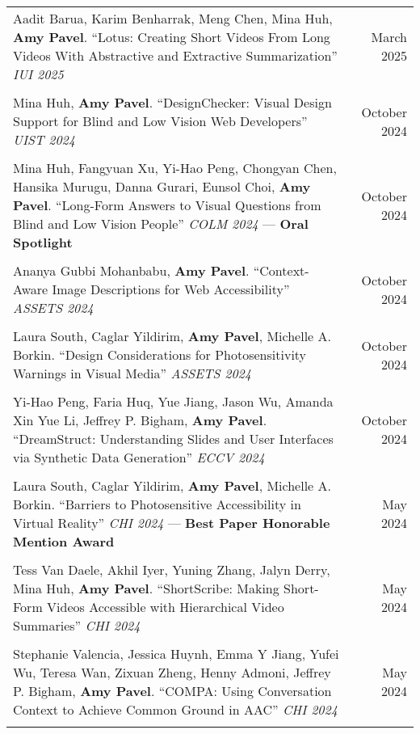 \begin{longtable}{Xr}
	Aadit Barua, Karim Benharrak, Meng Chen, Mina Huh, \textbf{Amy Pavel}. ``Lotus: Creating Short Videos From Long Videos With Abstractive and Extractive Summarization'' \textit{IUI 2025} & March 2025 \\
	\\

	Mina Huh, \textbf{Amy Pavel}. ``DesignChecker: Visual Design Support for Blind and Low Vision Web Developers'' \textit{UIST 2024} & October 2024 \\
	\\

	Mina Huh, Fangyuan Xu, Yi-Hao Peng, Chongyan Chen, Hansika Murugu, Danna Gurari, Eunsol Choi, \textbf{Amy Pavel}. ``Long-Form Answers to Visual Questions from Blind and Low Vision People'' \textit{COLM 2024} --- \textbf{Oral Spotlight} & October 2024 \\
	\\

	Ananya Gubbi Mohanbabu, \textbf{Amy Pavel}. ``Context-Aware Image Descriptions for Web Accessibility'' \textit{ASSETS 2024} & October 2024 \\
	\\

	Laura South, Caglar Yildirim, \textbf{Amy Pavel}, Michelle A. Borkin. ``Design Considerations for Photosensitivity Warnings in Visual Media'' \textit{ASSETS 2024} & October 2024 \\
	\\

	Yi-Hao Peng, Faria Huq, Yue Jiang, Jason Wu, Amanda Xin Yue Li, Jeffrey P. Bigham, \textbf{Amy Pavel}. ``DreamStruct: Understanding Slides and User Interfaces via Synthetic Data Generation'' \textit{ECCV 2024} & October 2024 \\
	\\

	Laura South, Caglar Yildirim, \textbf{Amy Pavel}, Michelle A. Borkin. ``Barriers to Photosensitive Accessibility in Virtual Reality'' \textit{CHI 2024} --- \textbf{Best Paper Honorable Mention Award} & May 2024 \\
	\\

	Tess Van Daele, Akhil Iyer, Yuning Zhang, Jalyn Derry, Mina Huh, \textbf{Amy Pavel}. ``ShortScribe: Making Short-Form Videos Accessible with Hierarchical Video Summaries'' \textit{CHI 2024} & May 2024 \\
	\\

	Stephanie Valencia, Jessica Huynh, Emma Y Jiang, Yufei Wu, Teresa Wan, Zixuan Zheng, Henny Admoni, Jeffrey P. Bigham, \textbf{Amy Pavel}. ``COMPA: Using Conversation Context to Achieve Common Ground in AAC'' \textit{CHI 2024} & May 2024 \\
	\\


\end{longtable}

